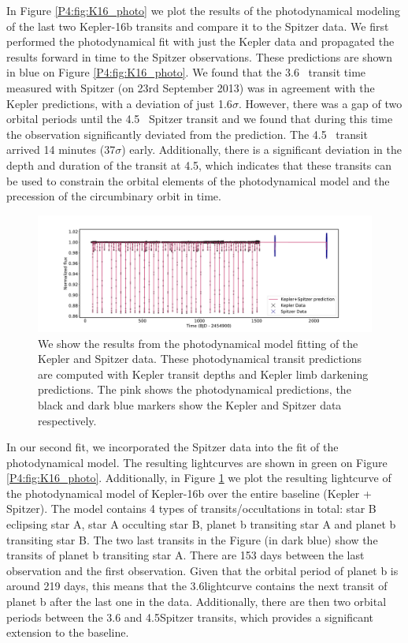 In Figure \ref{P4:fig:K16_photo} we plot the results of the photodynamical modeling of the last two Kepler-16b transits and compare it to the Spitzer data.
We first performed the photodynamical fit with just the Kepler data and propagated the results forward in time to the Spitzer observations. These predictions are shown in blue on Figure \ref{P4:fig:K16_photo}. We found that the 3.6\um~ transit time measured with Spitzer (on 23rd September 2013) was in agreement with the Kepler predictions, with a deviation of just 1.6$\sigma$. However, there was a gap of two orbital periods until the 4.5\um~ Spitzer transit and we found that during this time the observation significantly deviated from the prediction. The 4.5\um~ transit arrived 14 minutes (37$\sigma$) early. Additionally, there is a significant deviation in the depth and duration of the transit at 4.5\um, which indicates that these transits can be used to constrain the orbital elements of the photodynamical model and the precession of the circumbinary orbit in time.

\begin{figure}
    \centering
    \includegraphics[trim={1cm 0 1cm 0},clip,width=\linewidth]{Kepler16b_photodynamicalmodel.pdf}
    \caption{We show the results from the photodynamical model fitting of the Kepler and Spitzer data. These photodynamical transit predictions are computed with Kepler transit depths and Kepler limb darkening predictions. The pink shows the photodynamical predictions, the black and dark blue markers show the Kepler and Spitzer data respectively.}
    \label{P4:fig:K16_model}
\end{figure}


In our second fit, we incorporated the Spitzer data into the fit of the photodynamical model. The resulting lightcurves are shown in green on Figure \ref{P4:fig:K16_photo}. Additionally, in Figure \ref{P4:fig:K16_model} we plot the resulting lightcurve of the photodynamical model of Kepler-16b over the entire baseline (Kepler + Spitzer). The model contains 4 types of transits/occultations in total: star B eclipsing star A, star A occulting star B, planet b transiting star A and planet b transiting star B. The two last transits in the Figure (in dark blue) show the \spitzer transits of planet b transiting star A. There are 153 days between the last \Kepler observation and the first \spitzer observation. Given that the orbital period of planet b is around 219 days, this means that the 3.6\um \spitzer lightcurve contains the next transit of planet b after the last one in the \Kepler data. Additionally, there are then two orbital periods between the 3.6 and 4.5\um Spitzer transits, which provides a significant extension to the baseline.

